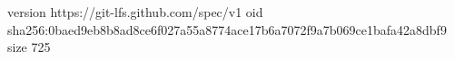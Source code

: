 version https://git-lfs.github.com/spec/v1
oid sha256:0baed9eb8b8ad8ce6f027a55a8774ace17b6a7072f9a7b069ce1bafa42a8dbf9
size 725
